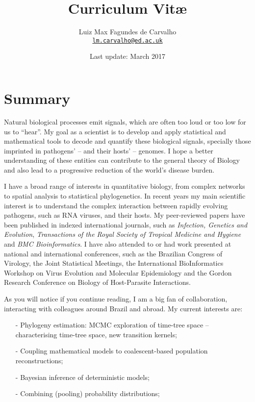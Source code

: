 \documentclass[10pt]{article}
\title{\bfseries Curriculum Vit\ae}
\author{Luiz Max Fagundes de Carvalho \\
\href{mailto:lm.carvalho@ed.ac.uk}{\nolinkurl{lm.carvalho@ed.ac.uk}}}
\affil{Rambaut Group, Institute of Evolutionary Biology, School of Biological Sciences, University of Edinburgh, UK.}
\date{Last update: March 2017}
\begin{document}
\maketitle

\section*{Summary}

Natural biological processes emit signals, which are often too loud or too low for us to ``hear''.
My goal as a scientist is to develop and apply statistical and mathematical tools to decode and quantify these biological signals, specially those imprinted in pathogens' -- and their hosts' -- genomes.
I hope a better understanding of these entities can contribute to the general theory of Biology and also lead to a progressive reduction of the world's disease burden.

I have a broad range of interests in quantitative biology, from complex networks to spatial analysis to statistical phylogenetics.
In recent years my main scientific interest is to understand the complex interaction between rapidly evolving pathogens, such as {RNA} viruses, and their hosts.
My peer-reviewed papers have been published in indexed international journals, such as \textit{Infection, Genetics and Evolution}, \textit{Transactions of the Royal Society of Tropical Medicine and Hygiene} and \textit{BMC Bioinformatics}.
I have also attended to or had work presented at national and international conferences, such as the Brazilian Congress of Virology, the Joint Statistical Meetings, the International BioInformatics Workshop on Virus Evolution and Molecular Epidemiology and the Gordon Research Conference on Biology of Host-Parasite Interactions.

As you will notice if you continue reading, I am a big fan of collaboration, interacting with colleagues around Brazil and abroad.
My current interests are:
\begin{itemize}
\itemsep0.1em
 \item [-] Phylogeny estimation: MCMC exploration of time-tree space -- characterising time-tree space, new transition kernels;
 \item [-] Coupling mathematical models to coalescent-based population reconstructions;
 \item [-] Bayesian inference of deterministic models;
 \item [-] Combining (pooling) probability distributions;
\end{itemize}
\end{document}
